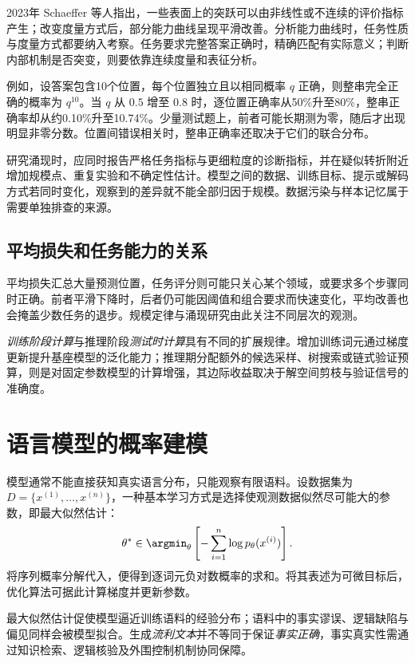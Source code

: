 \documentclass[../textbook.tex]{subfiles}
\begin{document}
2023年 Schaeffer 等人指出，一些表面上的突跃可以由非线性或不连续的评价指标产生；改变度量方式后，部分能力曲线呈现平滑改善\cite{schaeffer2023mirage}。分析能力曲线时，任务性质与度量方式都要纳入考察。任务要求完整答案正确时，精确匹配有实际意义；判断内部机制是否突变，则要依靠连续度量和表征分析。

例如，设答案包含10个位置，每个位置独立且以相同概率 $q$ 正确，则整串完全正确的概率为 $q^{10}$。当 $q$ 从 $0.5$ 增至 $0.8$ 时，逐位置正确率从50\%升至80\%，整串正确率却从约0.10\%升至10.74\%。少量测试题上，前者可能长期测为零，随后才出现明显非零分数。位置间错误相关时，整串正确率还取决于它们的联合分布。

研究涌现时，应同时报告严格任务指标与更细粒度的诊断指标，并在疑似转折附近增加规模点、重复实验和不确定性估计。模型之间的数据、训练目标、提示或解码方式若同时变化，观察到的差异就不能全部归因于规模。数据污染与样本记忆属于需要单独排查的来源。

\subsection{平均损失和任务能力的关系}
平均损失汇总大量预测位置，任务评分则可能只关心某个领域，或要求多个步骤同时正确。前者平滑下降时，后者仍可能因阈值和组合要求而快速变化，平均改善也会掩盖少数任务的退步。规模定律与涌现研究由此关注不同层次的观测。

\emph{训练阶段计算}与推理阶段\emph{测试时计算}具有不同的扩展规律。增加训练词元通过梯度更新提升基座模型的泛化能力；推理期分配额外的候选采样、树搜索或链式验证预算，则是对固定参数模型的计算增强，其边际收益取决于解空间剪枝与验证信号的准确度。

\section{语言模型的概率建模}

模型通常不能直接获知真实语言分布，只能观察有限语料。设数据集为 $D=\{x^{(1)},\ldots,x^{(n)}\}$，一种基本学习方式是选择使观测数据似然尽可能大的参数，即最大似然估计：
\begin{equation}
 \theta^*\in\argmin_\theta\left[-\sum_{i=1}^{n}\log p_\theta(x^{(i)})\right].
\end{equation}
将序列概率分解代入，便得到逐词元负对数概率的求和。将其表述为可微目标后，优化算法可据此计算梯度并更新参数。

最大似然估计促使模型逼近训练语料的经验分布；语料中的事实谬误、逻辑缺陷与偏见同样会被模型拟合。生成\emph{流利文本}并不等同于保证\emph{事实正确}，事实真实性需通过知识检索、逻辑核验及外围控制机制协同保障。
\end{document}
